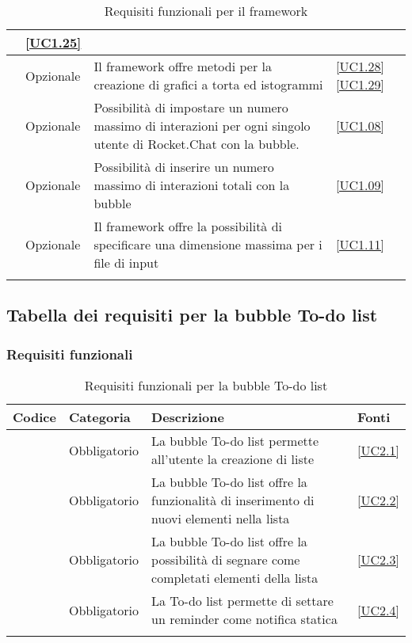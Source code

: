 \begin{longtable}{|P{1.5cm}|P{2.5cm}|P{6.5cm}|P{2.5cm}|}
	 & \ref{UC1.25} \\
	\hline \RequisitoOpF\label{L46} & Opzionale & Il framework offre metodi per la creazione di grafici a torta ed istogrammi
	 & \ref{UC1.28} \linebreak \ref{UC1.29}  \\	 
	 \hline \RequisitoOpF\label{L47} & Opzionale & Possibilità di impostare un numero massimo di interazioni per ogni singolo utente di Rocket.Chat con la bubble. & \ref{UC1.08} \\
	 \hline \RequisitoOpF\label{L48} & Opzionale & Possibilità di inserire un numero massimo di interazioni totali con la bubble & \ref{UC1.09} \\
	 \hline \RequisitoOpF\label{L49} & Opzionale & Il framework offre la possibilità di specificare una dimensione massima per i file di input & \ref{UC1.11} \\
	\hline
	\caption{Requisiti funzionali per il framework}
\end{longtable}


\subsection{Tabella dei requisiti per la bubble To-do list}

\subsubsection{Requisiti funzionali}

\begin{longtable}{|P{1.5cm}|P{2.5cm}|P{6.5cm}|P{2.5cm}|}
	\hline \textbf{Codice} & \textbf{Categoria} & \textbf{Descrizione} & \textbf{Fonti} \\
	\hline \RequisitoObF\label{L17} & Obbligatorio & La bubble To-do list permette all'utente la creazione di liste & \ref{UC2.1} \\
	\hline \RequisitoObF\label{L18} & Obbligatorio & La bubble To-do list offre la funzionalità di inserimento di nuovi elementi nella lista & \ref{UC2.2} \\
	\hline \RequisitoObF\label{L19} & Obbligatorio & La bubble To-do list offre la possibilità di segnare come completati elementi della lista & \ref{UC2.3} \\
	\hline \RequisitoObF\label{L20} & Obbligatorio & La To-do list permette di settare un reminder come notifica statica & \ref{UC2.4} \\
	\hline
	\caption{Requisiti funzionali per la bubble To-do list}
\end{longtable}

